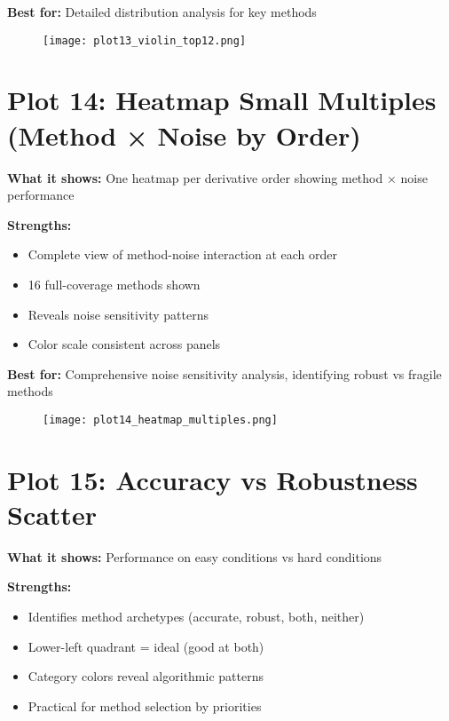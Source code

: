 \documentclass[11pt]{article}
\begin{document}
\textbf{Best for:} Detailed distribution analysis for key methods

\begin{figure}[h]
\centering
\texttt{[image: plot13\_violin\_top12.png]}
\end{figure}

\clearpage


\section*{Plot 14: Heatmap Small Multiples (Method × Noise by Order)}

\textbf{What it shows:} One heatmap per derivative order showing method × noise performance

\textbf{Strengths:}
\begin{itemize}
    \item Complete view of method-noise interaction at each order
    \item 16 full-coverage methods shown
    \item Reveals noise sensitivity patterns
    \item Color scale consistent across panels
\end{itemize}

\textbf{Best for:} Comprehensive noise sensitivity analysis, identifying robust vs fragile methods

\begin{figure}[h]
\centering
\texttt{[image: plot14\_heatmap\_multiples.png]}
\end{figure}

\clearpage


\section*{Plot 15: Accuracy vs Robustness Scatter}

\textbf{What it shows:} Performance on easy conditions vs hard conditions

\textbf{Strengths:}
\begin{itemize}
    \item Identifies method archetypes (accurate, robust, both, neither)
    \item Lower-left quadrant = ideal (good at both)
    \item Category colors reveal algorithmic patterns
    \item Practical for method selection by priorities
\end{itemize}
\end{document}
